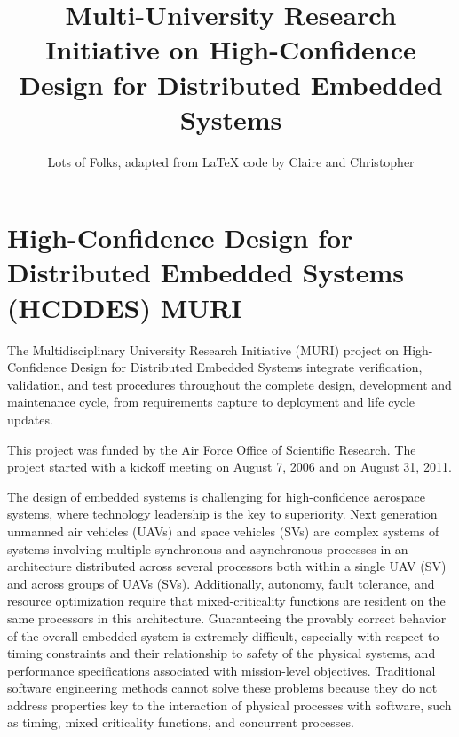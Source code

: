 \documentclass[12pt]{article}
\author{Lots of Folks, adapted from LaTeX code by Claire and Christopher}
\title{Multi-University Research Initiative on High-Confidence Design for Distributed Embedded Systems}
\begin{document}


               \pagebreak{}

               \tableofcontents

               \pagebreak{}



               \pagebreak

               \section{High-Confidence Design for Distributed Embedded Systems (HCDDES) MURI}

               The Multidisciplinary University Research Initiative
               (MURI) project on High-Confidence Design for
               Distributed Embedded Systems integrate verification,
               validation, and test procedures throughout the complete
               design, development and maintenance cycle, from
               requirements capture to deployment and life cycle
               updates. 
               
               This project was funded by the Air Force Office
               of Scientific Research.  The project started with a kickoff meeting on August 7, 2006 and on August 31, 2011.

The design of embedded systems is challenging for high-confidence aerospace systems, where technology leadership is the key to superiority. Next generation unmanned air vehicles (UAVs) and space vehicles (SVs) are complex systems of systems involving multiple synchronous and asynchronous processes in an architecture distributed across several processors both within a single UAV (SV) and across groups of UAVs (SVs). Additionally, autonomy, fault tolerance, and resource optimization require that mixed-criticality functions are resident on the same processors in this architecture. Guaranteeing the provably correct behavior of the overall embedded system is extremely difficult, especially with respect to timing constraints and their relationship to safety of the physical systems, and performance specifications associated with mission-level objectives. Traditional software engineering methods cannot solve these problems because they do not address properties key to the interaction of physical processes with software, such as timing, mixed criticality functions, and concurrent processes.

\end{document}
